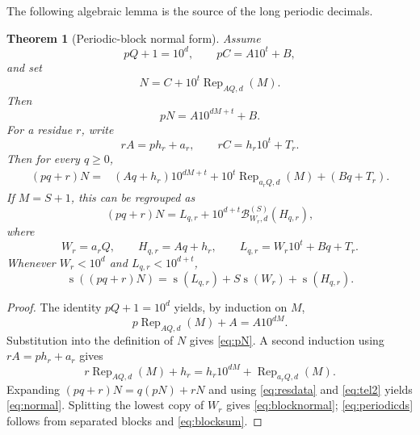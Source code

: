 \documentclass[11pt]{article}
\newtheorem{theorem}{Theorem}[section]
\newcommand{\ds}{\operatorname{s}}
\begin{document}
The following algebraic lemma is the source of the long periodic decimals.

\begin{theorem}[Periodic-block normal form]\label{thm:periodicnormal}
Assume
\begin{equation}\label{eq:pq}
 pQ+1=10^d,
 \qquad
 pC=A10^t+B,
\end{equation}
and set
\[
 N=C+10^t\operatorname{Rep}_{AQ,d}(M).
\]
Then
\begin{equation}\label{eq:pN}
 pN=A10^{dM+t}+B.
\end{equation}
For a residue $r$, write
\begin{equation}\label{eq:resdata}
 rA=ph_r+a_r,
 \qquad
 rC=h_r10^t+T_r.
\end{equation}
Then for every $q\ge0$,
\begin{equation}\label{eq:normal}
\begin{aligned}
 (pq+r)N={}&(Aq+h_r)10^{dM+t}
 +10^t\operatorname{Rep}_{a_rQ,d}(M)
 +(Bq+T_r).
\end{aligned}
\end{equation}
If $M=S+1$, this can be regrouped as
\begin{equation}\label{eq:blocknormal}
 (pq+r)N=L_{q,r}+10^{d+t}
 \mathcal B_{W_r,d}^{(S)}(H_{q,r}),
\end{equation}
where
\[
 W_r=a_r Q,
 \qquad H_{q,r}=Aq+h_r,
 \qquad L_{q,r}=W_r10^t+Bq+T_r.
\]
Whenever $W_r<10^d$ and $L_{q,r}<10^{d+t}$,
\begin{equation}\label{eq:periodicds}
 \ds((pq+r)N)
 =\ds(L_{q,r})+S\ds(W_r)+\ds(H_{q,r}).
\end{equation}
\end{theorem}

\begin{proof}
The identity $pQ+1=10^d$ yields, by induction on $M$,
\begin{equation}\label{eq:tel1}
 p\operatorname{Rep}_{AQ,d}(M)+A=A10^{dM}.
\end{equation}
Substitution into the definition of $N$ gives \eqref{eq:pN}.  A second induction using $rA=ph_r+a_r$ gives
\begin{equation}\label{eq:tel2}
 r\operatorname{Rep}_{AQ,d}(M)+h_r
 =h_r10^{dM}+\operatorname{Rep}_{a_rQ,d}(M).
\end{equation}
Expanding $(pq+r)N=q(pN)+rN$ and using \eqref{eq:resdata} and \eqref{eq:tel2} yields \eqref{eq:normal}.  Splitting the lowest copy of $W_r$ gives \eqref{eq:blocknormal}; \eqref{eq:periodicds} follows from separated blocks and \eqref{eq:blocksum}.
\end{proof}
\end{document}
